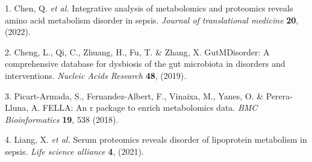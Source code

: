 \documentclass[
]{article}
\newenvironment{cslreferences}%
  {}%
  {\par}
\begin{document}
\hypertarget{refs}{}
\begin{cslreferences}
\leavevmode\hypertarget{ref-IntegrativeAnaChen2022}{}%
1. Chen, Q. \emph{et al.} Integrative analysis of metabolomics and proteomics reveals amino acid metabolism disorder in sepsis. \emph{Journal of translational medicine} \textbf{20}, (2022).

\leavevmode\hypertarget{ref-GutmdisorderACheng2019}{}%
2. Cheng, L., Qi, C., Zhuang, H., Fu, T. \& Zhang, X. GutMDisorder: A comprehensive database for dysbiosis of the gut microbiota in disorders and interventions. \emph{Nucleic Acids Research} \textbf{48}, (2019).

\leavevmode\hypertarget{ref-FellaAnRPacPicart2018}{}%
3. Picart-Armada, S., Fernandez-Albert, F., Vinaixa, M., Yanes, O. \& Perera-Lluna, A. FELLA: An r package to enrich metabolomics data. \emph{BMC Bioinformatics} \textbf{19}, 538 (2018).

\leavevmode\hypertarget{ref-SerumProteomicLiang2021}{}%
4. Liang, X. \emph{et al.} Serum proteomics reveals disorder of lipoprotein metabolism in sepsis. \emph{Life science alliance} \textbf{4}, (2021).
\end{cslreferences}
\end{document}
